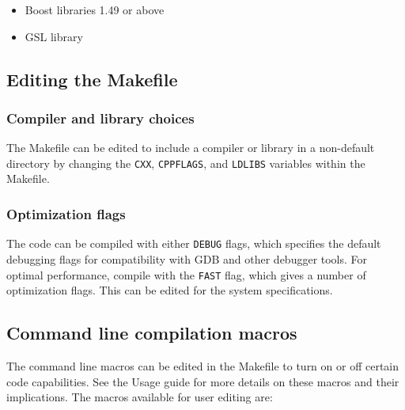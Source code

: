 \documentclass[11pt, oneside]{article}   	%
\begin{document}
\begin{itemize}
\item Boost libraries 1.49 or above
\item  GSL library
\end{itemize} 

\subsection{Editing the Makefile}

\subsubsection{Compiler and library choices}

The Makefile can be edited to include a compiler or library in a non-default directory by changing the \texttt{CXX}, \texttt{CPPFLAGS}, and \texttt{LDLIBS} variables within the Makefile. 

\subsubsection{Optimization flags}

The code can be compiled with either \texttt{DEBUG} flags, which specifies the default debugging flags for compatibility with GDB and other debugger tools. For optimal performance, compile with the \texttt{FAST} flag, which gives a number of optimization flags. This can be edited for the system specifications.

\subsection {Command line compilation macros}

The command line macros can be edited in the Makefile to turn on or off certain code capabilities. See the Usage guide for more details on these macros and their implications. The macros available for user editing are: \newline
\end{document}
